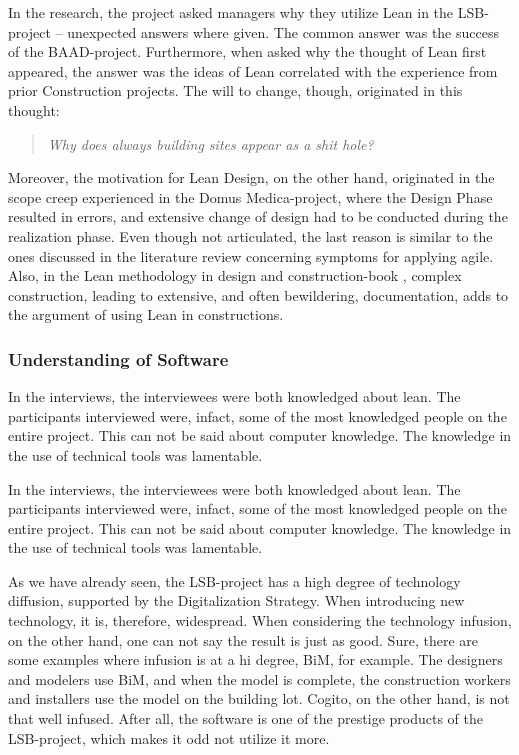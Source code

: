 In the research, the project asked managers why they utilize Lean in the LSB-project – unexpected answers where given. The common answer was the success of the BAAD-project. Furthermore, when asked why the thought of Lean first appeared, the answer was the ideas of Lean correlated with the experience from prior Construction projects. The will to change, though, originated in this thought: 
\begin{quote}
 \textit{Why does always building sites appear as a shit hole?}
\end{quote}

Moreover, the motivation for Lean Design, on the other hand, originated in the scope creep experienced in the Domus Medica-project, where the Design Phase resulted in errors, and extensive change of design had to be conducted during the realization phase. Even though not articulated, the last reason is similar to the ones discussed in the literature review concerning symptoms for applying agile. Also, in the Lean methodology in design and construction-book \cite{lean_i_praksis}, complex construction, leading to extensive, and often bewildering, documentation, adds to the argument of using Lean in constructions. 


\subsubsection{Understanding of Software}
In the interviews, the interviewees were both knowledged about lean. The participants interviewed were, infact, some of the most knowledged people on the entire project. This can not be said about computer knowledge. The knowledge in the use of technical tools was lamentable.

In the interviews, the interviewees were both knowledged about lean. The participants interviewed were, infact, some of the most knowledged people on the entire project. This can not be said about computer knowledge. The knowledge in the use of technical tools was lamentable.

As we have already seen, the LSB-project has a high degree of technology diffusion, supported by the Digitalization Strategy. When introducing new technology, it is, therefore, widespread. When considering the technology infusion, on the other hand, one can not say the result is just as good. Sure, there are some examples where infusion is at a hi degree, BiM, for example. The designers and modelers use BiM, and when the model is complete, the construction workers and installers use the model on the building lot. Cogito, on the other hand, is not that well infused. After all, the software is one of the prestige products of the LSB-project, which makes it odd not utilize it more. 


